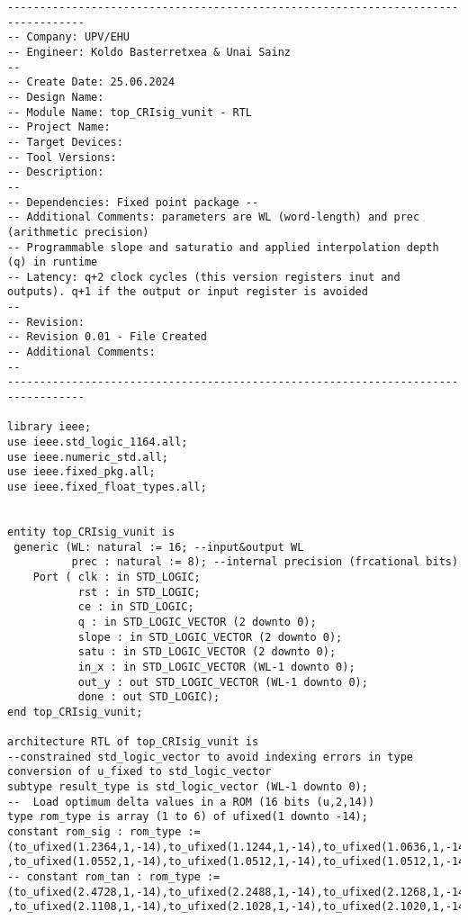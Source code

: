 \begin{code}
\begin{verbatim}
----------------------------------------------------------------------------------
-- Company: UPV/EHU
-- Engineer: Koldo Basterretxea & Unai Sainz
-- 
-- Create Date: 25.06.2024
-- Design Name: 
-- Module Name: top_CRIsig_vunit - RTL
-- Project Name: 
-- Target Devices: 
-- Tool Versions: 
-- Description: 
-- 
-- Dependencies: Fixed point package -- 
-- Additional Comments: parameters are WL (word-length) and prec (arithmetic precision)
-- Programmable slope and saturatio and applied interpolation depth (q) in runtime
-- Latency: q+2 clock cycles (this version registers inut and outputs). q+1 if the output or input register is avoided
-- 
-- Revision:
-- Revision 0.01 - File Created
-- Additional Comments:
-- 
----------------------------------------------------------------------------------
       
library ieee;
use ieee.std_logic_1164.all;
use ieee.numeric_std.all;
use ieee.fixed_pkg.all;
use ieee.fixed_float_types.all;
    
        
entity top_CRIsig_vunit is
 generic (WL: natural := 16; --input&output WL
          prec : natural := 8); --internal precision (frcational bits)
    Port ( clk : in STD_LOGIC;
           rst : in STD_LOGIC;
           ce : in STD_LOGIC;
           q : in STD_LOGIC_VECTOR (2 downto 0);
           slope : in STD_LOGIC_VECTOR (2 downto 0);
           satu : in STD_LOGIC_VECTOR (2 downto 0);
           in_x : in STD_LOGIC_VECTOR (WL-1 downto 0);
           out_y : out STD_LOGIC_VECTOR (WL-1 downto 0);
           done : out STD_LOGIC);
end top_CRIsig_vunit;
        
architecture RTL of top_CRIsig_vunit is
--constrained std_logic_vector to avoid indexing errors in type conversion of u_fixed to std_logic_vector
subtype result_type is std_logic_vector (WL-1 downto 0);
--	Load optimum delta values in a ROM (16 bits (u,2,14))
type rom_type is array (1 to 6) of ufixed(1 downto -14);
constant rom_sig : rom_type := (to_ufixed(1.2364,1,-14),to_ufixed(1.1244,1,-14),to_ufixed(1.0636,1,-14) ,to_ufixed(1.0552,1,-14),to_ufixed(1.0512,1,-14),to_ufixed(1.0512,1,-14));
-- constant rom_tan : rom_type := (to_ufixed(2.4728,1,-14),to_ufixed(2.2488,1,-14),to_ufixed(2.1268,1,-14) ,to_ufixed(2.1108,1,-14),to_ufixed(2.1028,1,-14),to_ufixed(2.1020,1,-14));


\end{verbatim}
\end{code}
